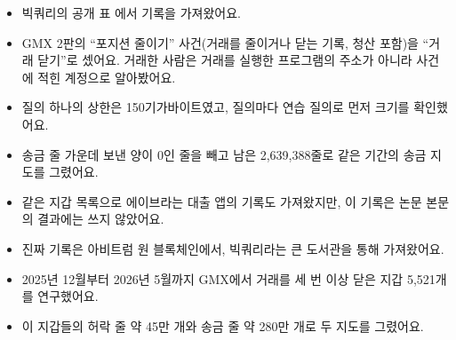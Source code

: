 \begin{deeper}[진짜 이름과 숫자]
\begin{itemize}
\item 빅쿼리의 공개 표 에서 기록을 가져왔어요.
\item GMX 2판의 “포지션 줄이기” 사건(거래를 줄이거나 닫는 기록, 청산 포함)을 “거래 닫기”로 셌어요.
      거래한 사람은 거래를 실행한 프로그램의 주소가 아니라 사건에 적힌 계정으로 알아봤어요.
\item 질의 하나의 상한은 150기가바이트였고, 질의마다 연습 질의로 먼저 크기를 확인했어요.
\item 송금 줄 가운데 보낸 양이 0인 줄을 빼고 남은 2,639,388줄로 같은 기간의 송금 지도를 그렸어요.
\item 같은 지갑 목록으로 에이브라는 대출 앱의 기록도 가져왔지만, 이 기록은 논문 본문의 결과에는 쓰지 않았어요.
\end{itemize}
\end{deeper}

\begin{learned}
\begin{itemize}
\item 진짜 기록은 아비트럼 원 블록체인에서, 빅쿼리라는 큰 도서관을 통해 가져왔어요.
\item 2025년 12월부터 2026년 5월까지 GMX에서 거래를 세 번 이상 닫은 지갑 5,521개를 연구했어요.
\item 이 지갑들의 허락 줄 약 45만 개와 송금 줄 약 280만 개로 두 지도를 그렸어요.
\end{itemize}
\end{learned}
